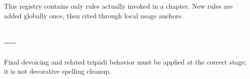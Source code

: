 \chapter{}
This registry contains only rules actually invoked in a chapter. New rules are added globally once, then cited through local usage anchors.
\section{ — }
Final devoicing and related tripādī behavior must be applied at the correct stage; it is not decorative spelling cleanup.
